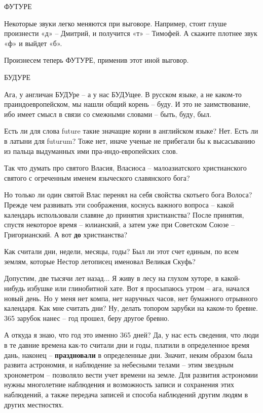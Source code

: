 \documentclass[a5paper,11pt,openany]{article}
\begin{document}
ФУТУРЕ\newline

  Некоторые звуки легко меняются при выговоре. Например, стоит глуше произнести «д» – Дмитрий, и получится «т» – Тимофей. А скажите плотнее звук «ф» и выйдет «б».

 Произнесем теперь ФУТУРЕ, применив этот иной выговор.\newline

БУДУРЕ\newline

 Ага, у англичан БУДУре – а у нас БУДУщее. В русском языке, а не каком-то праиндоевропейском, мы нашли общий корень – буду. И это не заимствование, ибо имеет смысл в связи со смежными словами – быть, буду, был.

Есть ли для слова future такие значащие корни в английском языке? Нет. Есть ли в латыни для futurum? Тоже нет, иначе ученые не прибегали бы к высасыванию из пальца выдуманных ими пра-индо-европейских слов.

 Так что думать про святого Власия, Власиоса – малоазиатского христианского святого с огреченным именем языческого славянского бога?

    Но только ли один святой Влас перенял на себя свойства скотьего бога Волоса? Прежде чем развивать эти соображения, коснусь важного вопроса – какой календарь использовали славяне до принятия христианства? После принятия, спустя некоторое время – юлианский, а затем уже при Советском Союзе – Григорианский. А вот \textbf{до} христианства? 

  Как считали дни, недели, месяцы, годы? Был ли этот счет единым, по всем землям, которые Нестор летописец именовал Великая Скуфь? 

 Допустим, две тысячи лет назад... Я живу в лесу на глухом хуторе, в какой-нибудь избушке или глинобитной хате. Вот я просыпаюсь утром – ага, начался новый день. Но у меня нет компа, нет наручных часов, нет бумажного отрывного календаря. Как мне считать дни? Ну, делать топором зарубки на каком-то бревне. 365 зарубок нанес – год прошел, беру другое бревно.

   А откуда я знаю, что год это именно 365 дней? Да, у нас есть сведения, что люди в те давние времена как-то считали дни и годы, платили в определенное время дань, наконец – \textbf{праздновали} в определенные дни. Значит, неким образом была развита астрономия, и наблюдение за небесными телами – этим звездным хронометром – позволяло вести учет времени на земле. Для развития астрономии нужны многолетние наблюдения и возможность записи и сохранения этих наблюдений, а также передача записей и способа наблюдений другим людям в других местностях.
\end{document}
